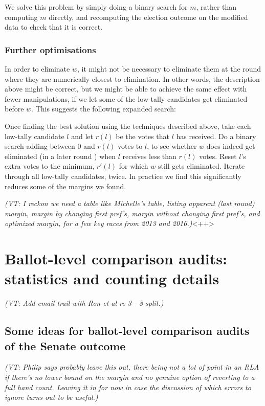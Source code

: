 \documentclass[10pt,a4paper]{article}
\newcommand{\VTNote}[1]{{\it(VT: #1)}}
\begin{document}
We solve this problem by simply doing a binary search for $m$, rather than computing $m$ directly, and recomputing the election outcome on the modified data to check that it is correct. 

\subsubsection{Further optimisations}
In order to eliminate $w$, it might not be necessary to eliminate them at the round where they are numerically closest to elimination.  In other words, the description above might be correct, but we might be able to achieve the same effect with fewer manipulations, if we let some of the low-tally candidates get eliminated before $w$.  This suggests the following expanded search:

Once finding the best solution using the techniques described above, take each low-tally candidate $l$ and let $r(l)$ be the votes that $l$ has received.  Do a binary search adding between 0 and $r(l)$ votes to $l$, to see whether $w$ does indeed get eliminated (in a later round ) when $l$ receives less than $r(l)$ votes.  Reset $l$'s extra votes to the minimum, $r'(l)$ for which $w$ still gets eliminated.  Iterate through all low-tally candidates, twice.  In practice we find this significantly reduces some of the margins we found.


\VTNote{I reckon we need a table like Michelle's table, listing apparent (last round) margin, margin by changing first pref's, margin without changing first pref's, and optimized margin, for a few key races from 2013 and 2016.}<++>



\section{Ballot-level comparison audits: statistics and counting details} \label{sec:comparisonAudits}
\VTNote{Add email trail with Ron et al re 3 - 8 split.}

\subsection{Some ideas for ballot-level comparison audits of the Senate outcome}
\VTNote{Philip says probably leave this out, there being not a lot of point in an RLA if there's no lower bound on the margin and no genuine option of reverting to a full hand count.  Leaving it in for now in case the discussion of which errors to ignore turns out to be useful.}
\end{document}
